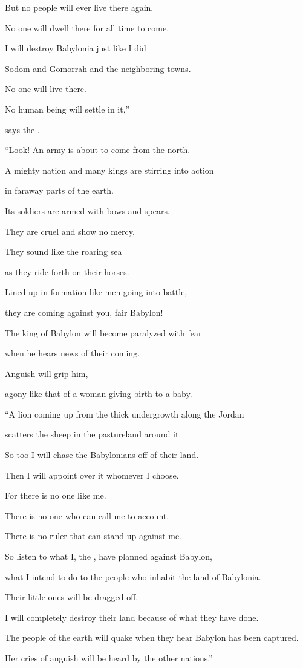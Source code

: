 {\par }{\Q But no people
will ever
live
there again.
\par }{\Q No one
will dwell
there for
all time to come.
\par }{\Q {}I will destroy
Babylonia just like I did
\par }{\Q Sodom
and Gomorrah
and the neighboring towns.
\par }{\Q No
one will live
there.
\par }{\Q No
human
being will settle
in it,”
\par }{\Q says
the {}.
\par }{\Q {}“Look! An army
is about to come
from the north.
\par }{\Q A mighty nation
and many
kings
are stirring
into action
\par }{\Q in faraway parts
of the earth.
\par }{\Q {}Its soldiers are armed
with bows
and spears.
\par }{\Q They are
cruel
and show no
mercy.
\par }{\Q They sound
like the roaring
sea
\par }{\Q as they ride
forth on
their
horses.
\par }{\Q Lined
up
in formation
like men
going
into battle,
\par }{\Q they are coming
against
you, fair
Babylon!
\par }{\Q {}The king
of Babylon
will become paralyzed
with fear

\par }{\Q when he hears
news
of their coming.
\par }{\Q Anguish
will grip
him,
\par }{\Q agony
like that of a woman giving birth to a baby.
\par }{\Q {}“A lion
coming up
from the thick undergrowth
along the Jordan
\par }{\Q scatters the sheep in the pastureland
around it.
\par }{\Q So too
I will chase
the Babylonians off
of their land.
\par }{\Q Then I will appoint
over it whomever
I choose.
\par }{\Q For
there is no one
like me.
\par }{\Q There is no one
who can call
me to account.
\par }{\Q There is no
ruler
that
can stand up
against me.
\par }{\Q {}So
listen
to what I, the
{}, have
planned
against
Babylon,
\par }{\Q what
I intend
to do
to
the people
who inhabit the land
of Babylonia.
\par }{\Q Their little ones will be dragged
off.
\par }{\Q I will
completely destroy their land
because
of what they have done.
\par }{\Q {}The people of the earth
will quake
when they hear Babylon
has been captured.
\par }{\Q Her cries
of anguish
will be heard
by the other nations.”

}
